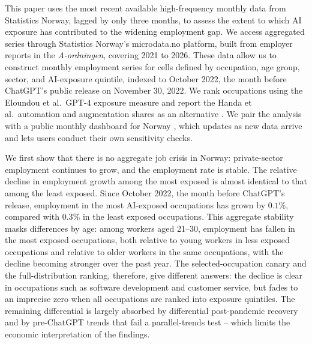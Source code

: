 \documentclass[12pt]{article}
\begin{document}
This paper uses the most recent available high-frequency monthly data from Statistics Norway, lagged by only three months, to assess the extent to which AI exposure has contributed to the widening employment gap. We access aggregated series through Statistics Norway’s microdata.no platform, built from employer reports in the \emph{A-ordningen}, covering 2021 to 2026. These data allow us to construct monthly employment series for cells defined by occupation, age group, sector, and AI-exposure quintile, indexed to October 2022, the month before ChatGPT’s public release on November 30, 2022. We rank occupations using the Eloundou et al.\ GPT-4 exposure measure \citep{eloundou2024} and report the Handa et al.\ automation and augmentation shares as an alternative \citep{handa2025}. We pair the analysis with a public monthly dashboard for Norway \citep{kiindeksen2026}, which updates as new data arrive and lets users conduct their own sensitivity checks. 

We first show that there is no aggregate job crisis in Norway: private-sector employment continues to grow, and the employment rate is stable. The relative decline in employment growth among the most exposed is almost identical to that among the least exposed. Since October 2022, the month before ChatGPT's release, employment in the most AI-exposed occupations has grown by $0.1\%$, compared with $0.3\%$ in the least exposed occupations. This aggregate stability masks differences by age: among workers aged 21--30, employment has fallen in the most exposed occupations, both relative to young workers in less exposed occupations and relative to older workers in the same occupations, with the decline becoming stronger over the past year. The selected-occupation canary and the full-distribution ranking, therefore, give different answers: the decline is clear in occupations such as software development and customer service, but fades to an imprecise zero when all occupations are ranked into exposure quintiles. The remaining differential is largely absorbed by differential post-pandemic recovery and by pre-ChatGPT trends that fail a parallel-trends test -- which limits the economic interpretation of the findings.
\end{document}
